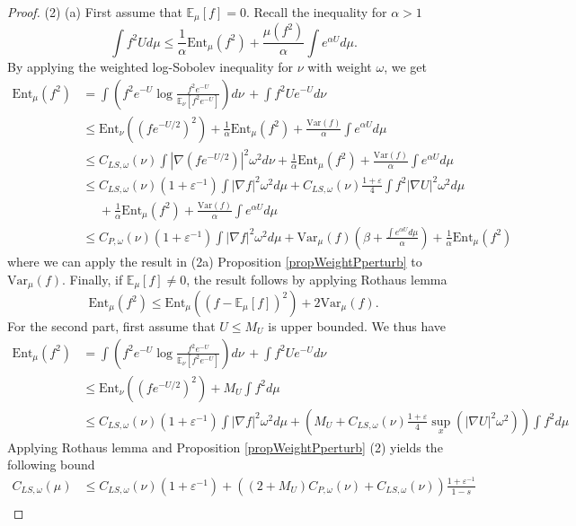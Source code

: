 \documentclass[11pt,reqno]{amsart}
\numberwithin{equation}{section}
\theoremstyle{definition}
\theoremstyle{remark}
\def \Var {\textrm{Var}}
\def \Ent {\textrm{Ent}}
\begin{document}
\begin{proof}
(2) (a) First assume that $\mathbb{E}_\mu[f]=0$. Recall the inequality for $\alpha>1$
$$\int f^2 Ud\mu\le \frac1\alpha\Ent_\mu(f^2)+\frac{\mu(f^2)}{\alpha}\int e^{\alpha U}d\mu.$$
By applying the weighted log-Sobolev inequality for $\nu$ with weight $\omega$, we get
\begin{align*}
\Ent_\mu(f^2) &= \int \left(f^2e^{-U}\log \frac{f^2e^{-U}}{\mathbb{E}_\nu[f^2e^{-U}]}\right)d\nu\, + \int f^2 Ue^{-U}  d\nu\\&
\leq  \Ent_\nu\left((fe^{-U/2})^2\right) + \frac{1}{\alpha}\Ent_\mu(f^2) + \frac{\Var(f)}{\alpha}\int e^{\alpha U} d\mu\\
&\leq C_{LS,\omega}(\nu) \int\left\vert\nabla \left(fe^{-U/2}\right)\right\vert^2\omega^2d\nu + \frac{1}{\alpha}\Ent_\mu(f^2) + \frac{\Var(f)}{\alpha}\int e^{\alpha U} d\mu\\
    &\le C_{LS,\omega}(\nu)(1+\varepsilon^{-1})\int|\nabla f|^2\omega^2d\mu + C_{LS,\omega}(\nu)\frac{1+\varepsilon}{4}\int f^2|\nabla U|^2\omega^2d\mu\\
    &\phantom{\le} + \frac{1}{\alpha}\Ent_\mu(f^2) + \frac{\Var(f)}{\alpha}\int e^{\alpha U} d\mu\\
    &\le C_{P,\omega}(\nu)(1+\varepsilon^{-1})\int|\nabla f|^2\omega^2d\mu+\Var_{\mu}(f)\left(\beta + \frac{\int e^{\alpha U}d\mu}{\alpha}\right)+\frac{1}{\alpha}\Ent_\mu(f^2)
\end{align*}
where we can apply the result in (2a) Proposition \ref{propWeightPperturb} to $\Var_{\mu}(f)$. Finally, if $\mathbb{E}_\mu[f]\neq0$, the result follows by applying Rothaus lemma
$$
\Ent_\mu(f^2)\leq \Ent_\mu((f-\mathbb{E}_\mu[f])^2)+ 2\Var_\mu(f).
$$
For the second part, first assume that $U\leq M_U$ is upper bounded. We thus have
\begin{align*}
\Ent_\mu(f^2) &= \int \left(f^2e^{-U}\log \frac{f^2e^{-U}}{\mathbb{E}_\nu[f^2e^{-U}]}\right)d\nu\, + \int f^2 Ue^{-U}  d\nu\\&
\leq  \Ent_\nu\left((fe^{-U/2})^2\right) + M_U \int f^2 d\mu\\
    &\le C_{LS,\omega}(\nu)(1+\varepsilon^{-1})\int|\nabla f|^2\omega^2d\mu + \left(M_U + C_{LS,\omega}(\nu)\frac{1+\varepsilon}{4}\sup_x(|\nabla U|^2\omega^2)\right)\int f^2d\mu
\end{align*}
Applying Rothaus lemma and Proposition \ref{propWeightPperturb} (2) yields the following bound
\begin{align*}
    C_{LS, \omega}(\mu)&\leq C_{LS, \omega}(\nu)(1+\varepsilon^{-1}) + ((2+M_U)C_{P, \omega}(\nu) + C_{LS, \omega}(\nu))\frac{1+\varepsilon^{-1}}{1-s}\\

\end{align*}
\end{proof}
\end{document}
